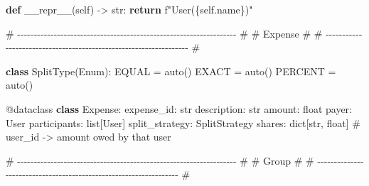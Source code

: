 \documentclass[11pt]{article}
\newenvironment{Shaded}{\begin{snugshade}}{\end{snugshade}}
\newcommand{\AttributeTok}[1]{\textcolor[rgb]{0.16,0.50,0.73}{#1}}
\newcommand{\BuiltInTok}[1]{\textcolor[rgb]{0.50,0.55,0.55}{#1}}
\newcommand{\CommentTok}[1]{\textcolor[rgb]{0.48,0.49,0.49}{#1}}
\newcommand{\ControlFlowTok}[1]{\textcolor[rgb]{0.99,0.74,0.29}{\textbf{#1}}}
\newcommand{\FunctionTok}[1]{\textcolor[rgb]{0.56,0.27,0.68}{#1}}
\newcommand{\KeywordTok}[1]{\textcolor[rgb]{0.81,0.81,0.76}{\textbf{#1}}}
\newcommand{\NormalTok}[1]{\textcolor[rgb]{0.81,0.81,0.76}{#1}}
\newcommand{\OperatorTok}[1]{\textcolor[rgb]{0.81,0.81,0.76}{#1}}
\newcommand{\SpecialCharTok}[1]{\textcolor[rgb]{0.24,0.68,0.91}{#1}}
\newcommand{\SpecialStringTok}[1]{\textcolor[rgb]{0.85,0.27,0.33}{#1}}
\newcommand{\VariableTok}[1]{\textcolor[rgb]{0.15,0.68,0.68}{#1}}
\begin{document}
\begin{Shaded}
\begin{Highlighting}[]
    \KeywordTok{def} \FunctionTok{\_\_repr\_\_}\NormalTok{(}\VariableTok{self}\NormalTok{) }\OperatorTok{{-}\textgreater{}} \BuiltInTok{str}\NormalTok{:}
        \ControlFlowTok{return} \SpecialStringTok{f"User(}\SpecialCharTok{\{}\VariableTok{self}\SpecialCharTok{.}\NormalTok{name}\SpecialCharTok{\}}\SpecialStringTok{)"}


\CommentTok{\# {-}{-}{-}{-}{-}{-}{-}{-}{-}{-}{-}{-}{-}{-}{-}{-}{-}{-}{-}{-}{-}{-}{-}{-}{-}{-}{-}{-}{-}{-}{-}{-}{-}{-}{-}{-}{-}{-}{-}{-}{-}{-}{-}{-}{-}{-}{-}{-}{-}{-}{-}{-}{-}{-}{-}{-}{-}{-}{-}{-}{-}{-}{-}{-}{-}{-} \#}
\CommentTok{\# Expense                                                             \#}
\CommentTok{\# {-}{-}{-}{-}{-}{-}{-}{-}{-}{-}{-}{-}{-}{-}{-}{-}{-}{-}{-}{-}{-}{-}{-}{-}{-}{-}{-}{-}{-}{-}{-}{-}{-}{-}{-}{-}{-}{-}{-}{-}{-}{-}{-}{-}{-}{-}{-}{-}{-}{-}{-}{-}{-}{-}{-}{-}{-}{-}{-}{-}{-}{-}{-}{-}{-}{-} \#}

\KeywordTok{class}\NormalTok{ SplitType(Enum):}
\NormalTok{    EQUAL }\OperatorTok{=}\NormalTok{ auto()}
\NormalTok{    EXACT }\OperatorTok{=}\NormalTok{ auto()}
\NormalTok{    PERCENT }\OperatorTok{=}\NormalTok{ auto()}


\AttributeTok{@dataclass}
\KeywordTok{class}\NormalTok{ Expense:}
\NormalTok{    expense\_id: }\BuiltInTok{str}
\NormalTok{    description: }\BuiltInTok{str}
\NormalTok{    amount: }\BuiltInTok{float}
\NormalTok{    payer: User}
\NormalTok{    participants: }\BuiltInTok{list}\NormalTok{[User]}
\NormalTok{    split\_strategy: SplitStrategy}
\NormalTok{    shares: }\BuiltInTok{dict}\NormalTok{[}\BuiltInTok{str}\NormalTok{, }\BuiltInTok{float}\NormalTok{]  }\CommentTok{\# user\_id {-}\textgreater{} amount owed by that user}


\CommentTok{\# {-}{-}{-}{-}{-}{-}{-}{-}{-}{-}{-}{-}{-}{-}{-}{-}{-}{-}{-}{-}{-}{-}{-}{-}{-}{-}{-}{-}{-}{-}{-}{-}{-}{-}{-}{-}{-}{-}{-}{-}{-}{-}{-}{-}{-}{-}{-}{-}{-}{-}{-}{-}{-}{-}{-}{-}{-}{-}{-}{-}{-}{-}{-}{-}{-}{-} \#}
\CommentTok{\# Group                                                               \#}
\CommentTok{\# {-}{-}{-}{-}{-}{-}{-}{-}{-}{-}{-}{-}{-}{-}{-}{-}{-}{-}{-}{-}{-}{-}{-}{-}{-}{-}{-}{-}{-}{-}{-}{-}{-}{-}{-}{-}{-}{-}{-}{-}{-}{-}{-}{-}{-}{-}{-}{-}{-}{-}{-}{-}{-}{-}{-}{-}{-}{-}{-}{-}{-}{-}{-}{-}{-}{-} \#}


\end{Highlighting}
\end{Shaded}
\end{document}
